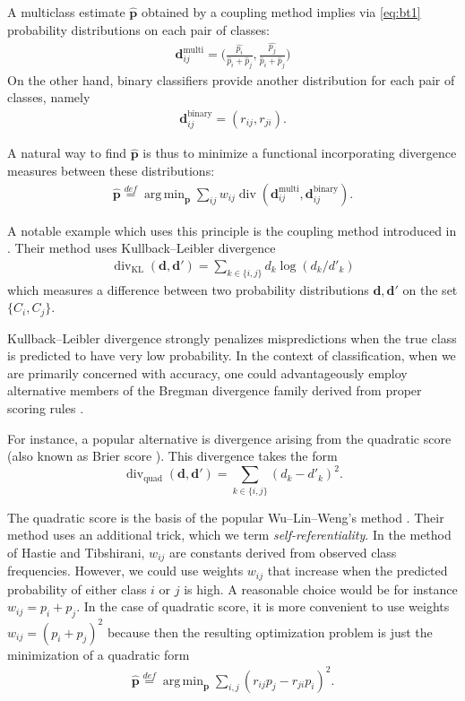 \documentclass[pdflatex, sn-basic]{sn-jnl}%
\DeclareMathOperator*{\divm}{div}
\DeclareMathOperator*{\argmin}{arg\,min}
\theoremstyle{thmstyleone}%
\theoremstyle{thmstyletwo}%
\theoremstyle{thmstylethree}%
\begin{document}
A multiclass estimate $\hat{\boldsymbol{p}}$ obtained by a coupling method implies via \eqref{eq:bt1} probability distributions on each pair of classes:
\begin{align*}
	\boldsymbol{d}_{ij}^\textrm{multi}= \biggl(\frac{\hat{p_i}}{\hat p_i + \hat p_j},\frac{\hat{p_j}}{\hat p_i + \hat p_j}\biggr)	
\end{align*}
On the other hand, binary classifiers provide another distribution for each pair of  classes, namely
\begin{align*}
\boldsymbol{d}_{ij}^\textrm{binary} = ( r_{ij},  r_{ji}).
\end{align*}

A natural way to find  $\hat{\boldsymbol{p}}$ is thus to minimize a functional incorporating divergence measures between these distributions:
\begin{align*}
\hat{\boldsymbol{p}} \stackrel{def}{=} \argmin_{\boldsymbol{p}} \sum_{ij} w_{ij} \divm (\boldsymbol{d}_{ij}^\textrm{multi}, \boldsymbol{d}_{ij}^\textrm{binary}).
\end{align*}

A notable example which uses this principle is the coupling method introduced in \cite{hastie1998classification}. Their method uses Kullback--Leibler divergence 
\begin{align*}
	\divm\nolimits_\textrm{KL} (\boldsymbol{d}, \boldsymbol{d'})= 
	  \sum_{k\in\{i,j\}} d_k \log (d_k/ d'_k)
\end{align*}
which measures a difference between two probability distributions $\boldsymbol{d}, \boldsymbol{d'}$ on the set $\{C_i, C_j\}$. 

Kullback--Leibler divergence strongly penalizes  mispredictions when the true class is predicted to have very low probability. In the context of classification, when we are primarily concerned with accuracy, one could advantageously employ alternative members of the Bregman divergence family derived from proper scoring rules \cite{gneiting2007strictly, buja2005loss}.
 
For instance, a popular alternative is divergence arising from the quadratic  score \cite{gneiting2007strictly} (also known as Brier score \cite{brier1950verification}). This divergence takes the form
$$
\divm\nolimits_\textrm{quad} (\boldsymbol{d}, \boldsymbol{d'})= \sum_{k\in\{i,j\}} (d_k - d'_k)^2.
$$

The quadratic score is the basis of the popular Wu--Lin--Weng's method \cite{wu2004probability}. 
Their method uses an additional trick, which we term \emph{self-referentiality}. In the method of Hastie and Tibshirani, $w_{ij}$ are constants derived from observed class frequencies. However, we could use weights $w_{ij}$ that increase when the predicted probability of either class $i$ or $j$ is high. A reasonable choice would be for instance $w_{ij}= p_i + p_j$. In the case of quadratic score, 
it is more convenient to use weights $w_{ij} = (p_i + p_j)^2$ because then 
the resulting optimization problem is just the minimization of a quadratic form
\begin{align*}
\hat{\boldsymbol{p}} \stackrel{def}{=} \argmin_{\boldsymbol{p}} \sum_{i,j} (r_{ij}p_j - r_{ji}p_i)^2.
\end{align*}
\end{document}
